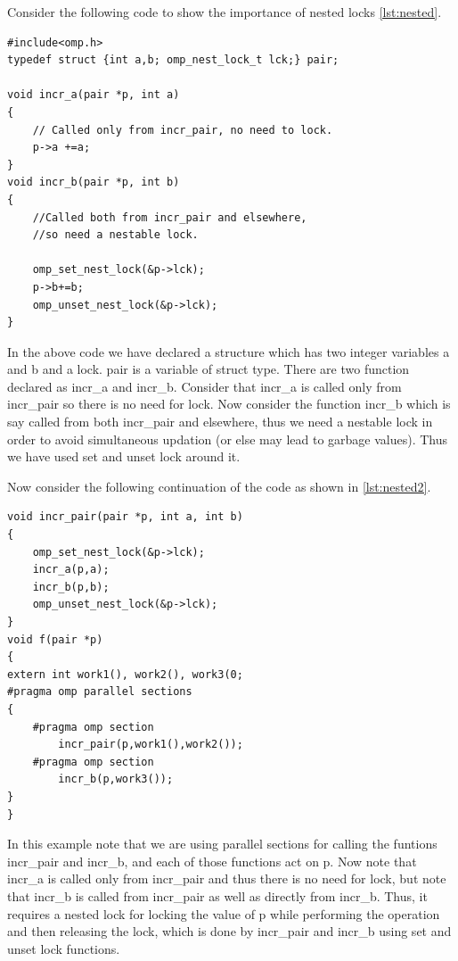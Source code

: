 \documentclass[12pt]{article}
\begin{document}
Consider the following code to show the importance of nested locks \ref{lst:nested}.
\begin{lstlisting}[caption={Nested lock-Example},captionpos=b,label={lst:nested}]
#include<omp.h>
typedef struct {int a,b; omp_nest_lock_t lck;} pair;

void incr_a(pair *p, int a)
{
    // Called only from incr_pair, no need to lock.
    p->a +=a;
}
void incr_b(pair *p, int b)
{
    //Called both from incr_pair and elsewhere,
    //so need a nestable lock.

    omp_set_nest_lock(&p->lck);
    p->b+=b;
    omp_unset_nest_lock(&p->lck);
}
\end{lstlisting}
In the above code we have declared a structure which has two integer variables a and b and a lock. pair is a variable of struct type. There are two function declared as incr\_a and incr\_b. Consider that incr\_a is called only from incr\_pair so there is no need for lock. Now consider the function incr\_b which is say called from both incr\_pair and elsewhere, thus we need a nestable lock in order to avoid simultaneous updation (or else may lead to garbage values). Thus we have used set and unset lock around it.

Now consider the following continuation of the code as shown in \ref{lst:nested2}.
\begin{lstlisting}[caption={Nest lock-Example2},captionpos=b,label={lst:nested2}]
void incr_pair(pair *p, int a, int b)
{
    omp_set_nest_lock(&p->lck);
    incr_a(p,a);
    incr_b(p,b);
    omp_unset_nest_lock(&p->lck);
}
void f(pair *p)
{
extern int work1(), work2(), work3(0;
#pragma omp parallel sections
{
    #pragma omp section
        incr_pair(p,work1(),work2());
    #pragma omp section
        incr_b(p,work3());
}
}
\end{lstlisting}
In this example note that we are using parallel sections for calling the funtions incr\_pair and incr\_b, and each of those functions act on p.  Now note that incr\_a is called only from incr\_pair and thus there is no need for lock, but note that incr\_b is called from incr\_pair as well as directly from incr\_b. Thus, it requires a nested lock for locking the value of p while performing the operation and then releasing the lock, which is done by incr\_pair and incr\_b using set and unset lock functions.
\end{document}
